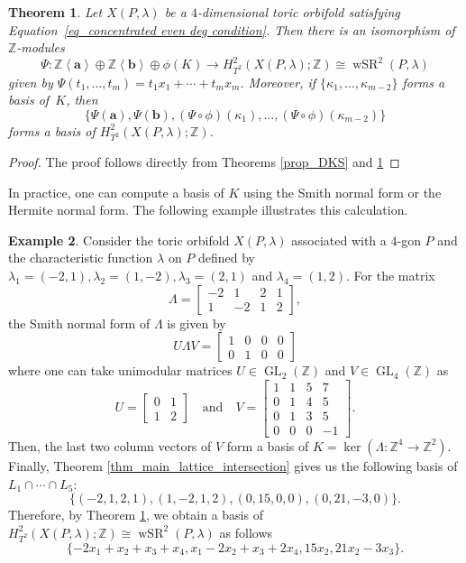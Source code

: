 \documentclass[10pt]{amsart}
\theoremstyle{plain}
\newtheorem{theorem}{Theorem}[section]
\theoremstyle{definition}
\newtheorem{example}[theorem]{Example}
\numberwithin{equation}{section}
\newcommand{\ZZ}{\mathbb{Z}}
\DeclareMathOperator{\GL}{GL}
\DeclareMathOperator{\wSR}{wSR}
\begin{document}
\begin{theorem}\label{thm_main}
Let $X(P, \lambda)$ be a $4$-dimensional toric orbifold satisfying Equation~\eqref{eq_concentrated even deg condition}.
Then there is an isomorphism of $\ZZ$-modules
\begin{equation}\label{eq_wSR2_decomp}
\Psi\colon
\mathbb{Z}\left<\mathbf{a}\right> \oplus \mathbb{Z}\left<\mathbf{b}\right>\oplus \phi(K)\to
H^2_{T^2}(X(P, \lambda);\ZZ)\cong\wSR^2(P,\lambda)
\end{equation}
given by $\Psi(t_1,\ldots,t_m)=t_1x_1+\cdots+t_mx_m$.
Moreover, if $\{\kappa_1,\ldots,\kappa_{m-2}\}$ forms a basis of~$K$, then
\[
\{ \Psi(\mathbf{a}), \Psi(\mathbf{b}), (\Psi\circ\phi)(\kappa_1), \dots,  (\Psi\circ\phi)(\kappa_{m-2})\}
\]
forms a basis of $H^2_{T^2}(X(P,\lambda);\ZZ)$.
\end{theorem}
\begin{proof}
The proof follows directly from Theorems \ref{prop_DKS} and \ref{thm_main}
\end{proof}


In practice, one can compute a basis of $K$ using the Smith normal form or the Hermite normal form. The following example illustrates this calculation.

\begin{example}\label{ex_snf}
Consider the toric orbifold $X(P,\lambda)$ associated with a $4$-gon $P$ and the characteristic function $\lambda$ on $P$  defined by $\lambda_1=(-2,1),\lambda_2=(1,-2), \lambda_3=(2,1)$ and $\lambda_4=(1,2)$. For the matrix 
\[
\Lambda = \begin{bmatrix}
-2 & 1 & 2 & 1 \\
1 & -2 & 1 & 2
\end{bmatrix},
\]
the Smith normal form of $\Lambda$ is given by 
\[
U\Lambda V=\begin{bmatrix} 1&0&0&0 \\ 0 & 1 & 0 & 0\end{bmatrix}
\]
where one can take unimodular matrices $U\in \GL_2(\ZZ)$ and $V\in \GL_4(\ZZ)$ as
\[
U=\begin{bmatrix} 0 & 1 \\ 1 & 2\end{bmatrix} \quad \text{and} \quad
V=\begin{bmatrix} 1&  1&  5&  7\\
0 & 1&  4&  5 \\
0 & 1&  3&  5 \\
0&  0&  0& -1
\end{bmatrix}.
\]
Then, the last two column vectors of $V$ form a basis of $K=\ker (\Lambda\colon \ZZ^4 \to \ZZ^2)$. Finally, Theorem  \ref{thm_main_lattice_intersection} gives us the following basis of $L_1\cap \cdots \cap L_5$:
\[
\{(-2,1,2,1), (1,-2,1,2),(0, 15, 0,0), (0,21,-3,0)\}.
\]
Therefore, by Theorem \ref{thm_main}, we obtain a basis of $H^2_{T^2}(X(P, \lambda);\ZZ)\cong \wSR^2(P, \lambda)$ as follows
\[
\{-2x_1+x_2+x_3+x_4, x_1-2x_2+x_3+2x_4, 15x_2, 21x_2-3x_3\}.
\]
\end{example}
\end{document}
